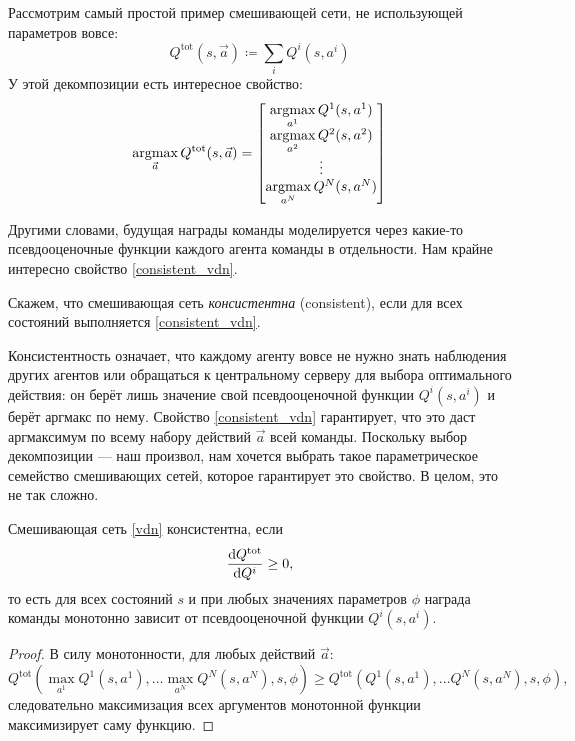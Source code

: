 \begin{example} Рассмотрим самый простой пример смешивающей сети, не использующей параметров вовсе:
$$Q^{\mathrm{tot}}(s, \vec{a}) \coloneqq \sum_i Q^i(s, a^i)$$
У этой декомпозиции есть интересное свойство: 
\begin{equation}\label{consistent_vdn}
\mathop{\mathrm{argmax}}_{\vec{a}} Q^{\mathrm{tot}}(s, \vec{a}) = \left[ 
\begin{matrix}
\mathop{\mathrm{argmax}}\limits_{a^1} Q^1(s, a^1) \\
\mathop{\mathrm{argmax}}\limits_{a^2} Q^2(s, a^2) \\
\vdots \\
\mathop{\mathrm{argmax}}\limits_{a^N} Q^N(s, a^N) \\
\end{matrix}
\right]
\end{equation}
\end{example}

Другими словами, будущая награды команды моделируется через какие-то псевдооценочные функции каждого агента команды в отдельности. Нам крайне интересно свойство \eqref{consistent_vdn}.

\begin{definition}
Скажем, что смешивающая сеть \emph{консистентна} (consistent), если для всех состояний выполняется \eqref{consistent_vdn}.
\end{definition}

Консистентность означает, что каждому агенту вовсе не нужно знать наблюдения других агентов или обращаться к центральному серверу для выбора оптимального действия: он берёт лишь значение свой псевдооценочной функции $Q^i(s, a^i)$ и берёт аргмакс по нему. Свойство \eqref{consistent_vdn} гарантирует, что это даст аргмаксимум по всему набору действий $\vec{a}$ всей команды. Поскольку выбор декомпозиции --- наш произвол, нам хочется выбрать такое параметрическое семейство смешивающих сетей, которое гарантирует это свойство. В целом, это не так сложно.

\begin{theorem}
Смешивающая сеть \eqref{vdn} консистентна, если
\begin{equation}\label{qmix_condition}
\frac{\mathop{}\!\mathrm{d} Q^{\mathrm{tot}}}{\mathop{}\!\mathrm{d} Q^i} \ge 0,
\end{equation}
то есть для всех состояний $s$ и при любых значениях параметров $\phi$ награда команды монотонно зависит от псевдооценочной функции $Q^i(s, a^i)$.
\begin{proof}
В силу монотонности, для любых действий $\vec{a}$:
$$Q^{\mathrm{tot}}( \max_{a^1} Q^1(s, a^1), \dots \max_{a^N} Q^N(s, a^N), s, \phi) \ge Q^{\mathrm{tot}}( Q^1(s, a^1), \dots Q^N(s, a^N), s, \phi),$$
следовательно максимизация всех аргументов монотонной функции максимизирует саму функцию.
\end{proof}
\end{theorem}


